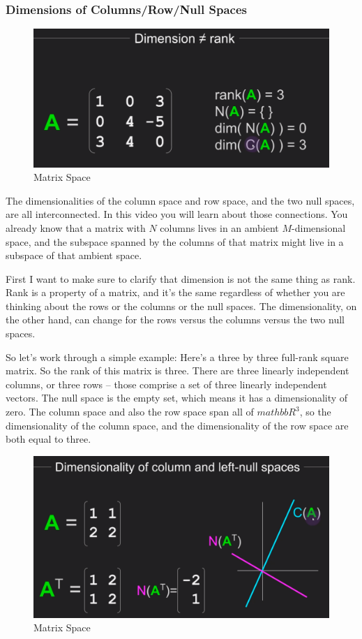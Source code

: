 \documentclass[fleqn,10pt]{olplainarticle}
\theoremstyle{definition}
\theoremstyle{remark}
\begin{document}
\pagebreak

\subsubsection*{Dimensions of Columns/Row/Null Spaces}

\begin{figure}[ht]
	\centering
	\includegraphics[width=0.6\linewidth]{images/matrix-space-31.png}
	\caption{Matrix Space}
	\label{fig:matrix_space_31}
\end{figure}

The dimensionalities of the column space and row space, and the two null spaces, are all interconnected. In this video you will learn about those connections. You already know that a matrix with $N$ columns lives in an ambient $M$-dimensional space, and the subspace spanned by the columns of that matrix might live in a subspace of that ambient space.

First I want to make sure to clarify that dimension is not the same thing as rank. Rank is a property of a matrix, and it's the same regardless of whether you are thinking about the rows or the columns or the null spaces. The dimensionality, on the other hand, can change for the rows versus the columns versus the two null spaces.

So let's work through a simple example: Here's a three by three full-rank square matrix. So the rank of this matrix is three. There are three linearly independent columns, or three rows -- those comprise a set of three linearly independent vectors. The null space is the empty set, which means it has a dimensionality of zero. The column space and also the row space span all of $mathbb{R}^3$, so the dimensionality of the column space, and the dimensionality of the row space are both equal to three.

\begin{figure}[ht]
	\centering
	\includegraphics[width=0.6\linewidth]{images/matrix-space-32.png}
	\caption{Matrix Space}
	\label{fig:matrix_space_32}
\end{figure}
\end{document}
